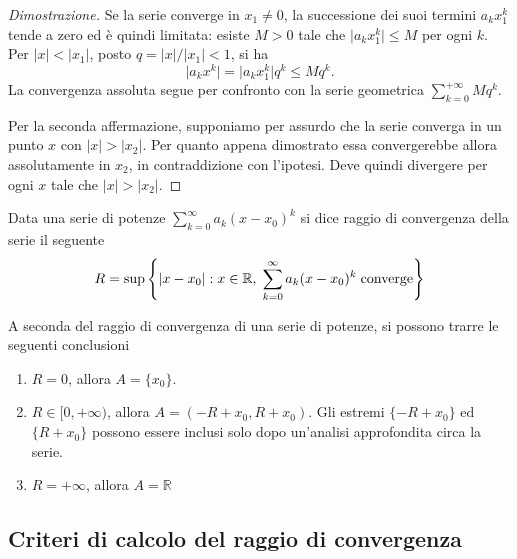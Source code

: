         \begin{proof}[Dimostrazione]
            Se la serie converge in $x_1\neq0$, la successione dei suoi
            termini $a_kx_1^k$ tende a zero ed è quindi limitata: esiste
            $M>0$ tale che $\lvert a_kx_1^k\rvert\leq M$ per ogni $k$.
            Per $\lvert x\rvert<\lvert x_1\rvert$, posto
            $q=\lvert x\rvert/\lvert x_1\rvert<1$, si ha
            \[
                \lvert a_kx^k\rvert
                =\lvert a_kx_1^k\rvert q^k
                \leq Mq^k.
            \]
            La convergenza assoluta segue per confronto con la serie
            geometrica $\sum_{k=0}^{+\infty}Mq^k$.

            Per la seconda affermazione, supponiamo per assurdo che la
            serie converga in un punto $x$ con
            $\lvert x\rvert>\lvert x_2\rvert$. Per quanto appena dimostrato
            essa convergerebbe allora assolutamente in $x_2$, in
            contraddizione con l'ipotesi. Deve quindi divergere per ogni
            $x$ tale che $\lvert x\rvert>\lvert x_2\rvert$.
        \end{proof}

        \begin{definition}
            Data una serie di potenze $\sum_{k = 0}^{\infty} a_{k}(x - x_{0})^{k}$ si dice raggio di convergenza della serie il seguente
            \[
                R = \sup\left\{ |x - x_{0}| : x \in \mathbb{R},\; \sum_{k = 0}^{\infty} a_{k}(x - x_{0})^{k} \; \textnormal{converge} \right\}
            \]
        \end{definition}

        A seconda del raggio di convergenza di una serie di potenze, si possono trarre le seguenti conclusioni
        \begin{enumerate}[label=(\arabic*)]
            \item $R = 0$, allora $A = \{x_{0}\}$.
            \item $R \in [0, +\infty)$, allora $A = (-R + x_{0}, R + x_{0})$. Gli estremi $\{-R + x_{0}\}$ ed $\{R + x_{0}\}$ possono essere inclusi solo dopo un'analisi approfondita circa la serie.
            \item $R = +\infty$, allora $A = \mathbb{R}$
        \end{enumerate}



        \subsection{Criteri di calcolo del raggio di convergenza}
